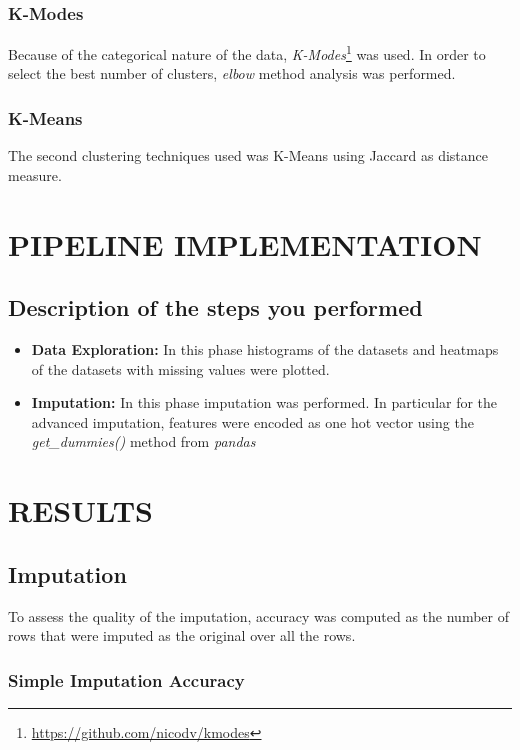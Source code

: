\documentclass{article}
\begin{document}
\subsubsection{K-Modes}
Because of the categorical nature of the data, \emph{K-Modes}\footnote{\url{https://github.com/nicodv/kmodes}} was used. In order to select the best number of clusters, \emph{elbow} method analysis was performed.
\subsubsection{K-Means}
The second clustering techniques used was K-Means using Jaccard as distance measure.

\section{PIPELINE IMPLEMENTATION}
\subsection{Description of the steps you performed}
\begin{itemize}
	\item\textbf{Data Exploration:} In this phase histograms of the datasets and heatmaps of the datasets with missing values were plotted.
	\item\textbf{Imputation:} In this phase imputation was performed.
		In particular for the advanced imputation, features were encoded as one hot vector using the \emph{get\_dummies()} method from \emph{pandas}
\end{itemize}
\newpage
\section{RESULTS}

\subsection{Imputation}
To assess the quality of the imputation, accuracy was computed as the number of rows that were imputed as the original over all the rows.

\subsubsection{Simple Imputation Accuracy}
\end{document}
